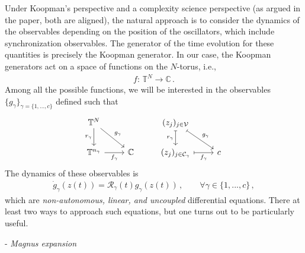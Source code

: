 \documentclass[aps,pre,reprint,longbibliography,superscriptaddress,noshowpacs,floatfix]{revtex4-2}
\theoremstyle{definition}
\theoremstyle{remark}
\begin{document}
Under Koopman's perspective and a complexity science perspective (as argued in the paper, both are aligned), the natural approach is to consider the dynamics of the observables depending on the position of the oscillators, which include synchronization observables. The generator of the time evolution for these quantities is precisely the Koopman generator. In our case, the Koopman generators act on a space of functions on the $N$-torus, i.e.,
\begin{align*}
    f:\,\mathbb{T}^N \to \mathbb{C}\,.
\end{align*}
Among all the possible functions, we will be interested in the observables $\{g_{\gamma}\}_{\gamma=\{1,...,c\}}$ defined such that 
\begin{equation*}
\begin{tikzcd}
\mathbb{T}^N\drar["g_{\gamma}"]\dar["r_{\gamma}" left]  &  &
(z_j)_{j\in \mathcal{V}}\drar[maps to, "g_{\gamma}"] \dar["r_{\gamma}" left, maps to] & \\
\mathbb{T}^{n_{\gamma}} \rar[swap, "f_{\gamma}"] & \mathbb{C} &
(z_j)_{j\in \mathcal{C}_\gamma} \rar[maps to, swap, "f_{\gamma}"] &  c
\end{tikzcd}
\end{equation*}
The dynamics of these observables is 
\begin{align}\label{eq:observable_dyn}
    \dot{g}_\gamma(z(t)) = \mathcal{R}_{\gamma}(t)g_\gamma(z(t))\,,\qquad \forall \gamma\in\{1,...,c\}\,,
\end{align}
which are \textit{non-autonomous, linear, and uncoupled} differential equations. There at least two ways to approach such equations, but one turns out to be particularly useful.



\vspace{0.3cm}
\noindent- \textit{Magnus expansion}
\vspace{0.3cm}
\end{document}

